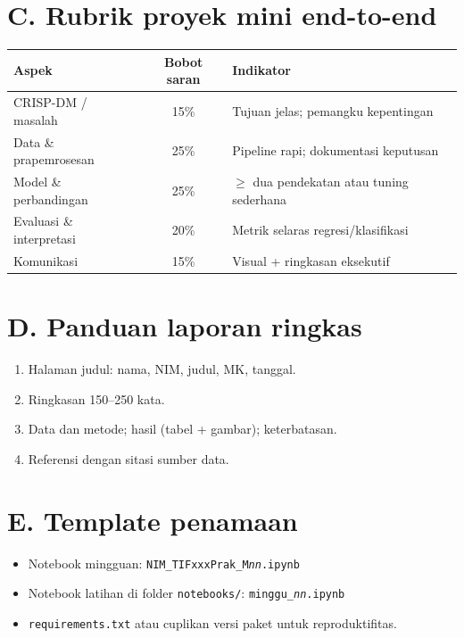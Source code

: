 \section*{C. Rubrik proyek mini end-to-end}

\begin{center}
\small
\begin{tabular}{|l|c|p{6.2cm}|}
\hline
\textbf{Aspek} & \textbf{Bobot saran} & \textbf{Indikator} \\
\hline
CRISP-DM / masalah & 15\% & Tujuan jelas; pemangku kepentingan \\
Data \& prapemrosesan & 25\% & Pipeline rapi; dokumentasi keputusan \\
Model \& perbandingan & 25\% & $\geq$ dua pendekatan atau tuning sederhana \\
Evaluasi \& interpretasi & 20\% & Metrik selaras regresi/klasifikasi \\
Komunikasi & 15\% & Visual + ringkasan eksekutif \\
\hline
\end{tabular}
\end{center}

\section*{D. Panduan laporan ringkas}

\begin{enumerate}[leftmargin=*]
  \item Halaman judul: nama, NIM, judul, MK, tanggal.
  \item Ringkasan 150--250 kata.
  \item Data dan metode; hasil (tabel + gambar); keterbatasan.
  \item Referensi dengan sitasi sumber data.
\end{enumerate}

\section*{E. Template penamaan}

\begin{itemize}[leftmargin=*]
  \item Notebook mingguan: \texttt{NIM\_TIFxxxPrak\_M\textit{nn}.ipynb}
  \item Notebook latihan di folder \texttt{notebooks/}: \texttt{minggu\_\textit{nn}.ipynb}
  \item \texttt{requirements.txt} atau cuplikan versi paket untuk reproduktifitas.
\end{itemize}


